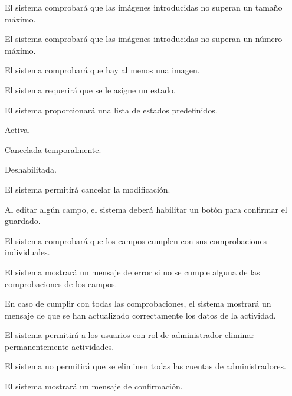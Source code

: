 \begin{enumitem}[label=\bfseries{RAdm \arabic*.},leftmargin=*]
\begin{enumitem}[label*=\bfseries{\arabic*.}]
\begin{enumitem}[label*=\bfseries{\arabic*.}]
\begin{enumitem}[label*=\bfseries{\arabic*.}]
				\item El sistema comprobará que las imágenes introducidas no superan un tamaño máximo.
				\item El sistema comprobará que las imágenes introducidas no superan un número máximo.
				\item El sistema comprobará que hay al menos una imagen.
			\end{enumitem}
		\end{enumitem}
		\item El sistema requerirá que se le asigne un estado.
		\begin{enumitem}[label*=\bfseries{\arabic*.}]
			\item El sistema proporcionará una lista de estados predefinidos.
			\begin{enumitem}[label*=\bfseries{\arabic*.}]
				\item Activa.
				\item Cancelada temporalmente.
				\item Deshabilitada.
			\end{enumitem}
		\end{enumitem}
		\item El sistema permitirá cancelar la modificación.
		\item Al editar algún campo, el sistema deberá habilitar un botón para confirmar el guardado.
		\begin{enumitem}[label*=\bfseries{\arabic*.}]
			\item El sistema comprobará que los campos cumplen con sus comprobaciones individuales.
			\begin{enumitem}[label*=\bfseries{\arabic*.}]
				\item El sistema mostrará un mensaje de error si no se cumple alguna de las comprobaciones de los campos.
				\item En caso de cumplir con todas las comprobaciones, el sistema mostrará un mensaje de que se han actualizado correctamente los datos de la actividad.
			\end{enumitem}
		\end{enumitem}
	\end{enumitem}
	\item El sistema permitirá a los usuarios con rol de administrador eliminar permanentemente actividades.
	\begin{enumitem}[label*=\bfseries{\arabic*.}]
		\item El sistema no permitirá que se eliminen todas las cuentas de administradores.
		\item El sistema mostrará un mensaje de confirmación.

\end{enumitem}
\end{enumitem}
